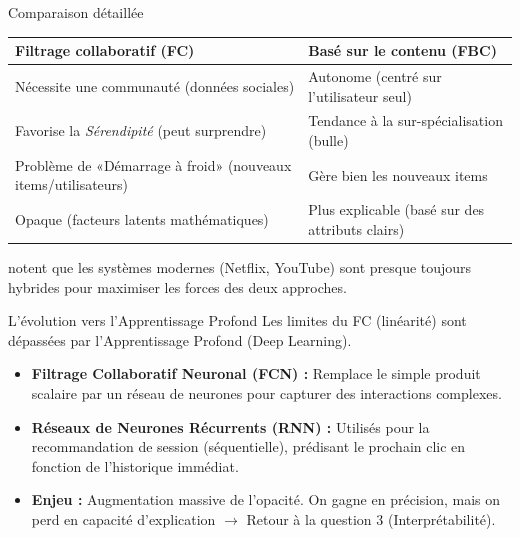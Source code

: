 \documentclass[9pt, aspectratio=169]{beamer}
\begin{document}
\begin{frame}{Comparaison détaillée}
    \begin{table}[]
        \centering
        \small
        \begin{tabular}{@{}p{5cm}p{5cm}@{}}
            \toprule
            \textbf{Filtrage collaboratif (FC)} & \textbf{Basé sur le contenu (FBC)} \\ \midrule
            Nécessite une communauté (données sociales) & Autonome (centré sur l'utilisateur seul) \\
            Favorise la \textit{Sérendipité} (peut surprendre) & Tendance à la sur-spécialisation (bulle) \\
            Problème de «Démarrage à froid» (nouveaux items/utilisateurs) & Gère bien les nouveaux items \\
            Opaque (facteurs latents mathématiques) & Plus explicable (basé sur des attributs clairs) \\ \bottomrule
        \end{tabular}
    \end{table}
    \textcite{Ko2022} notent que les systèmes modernes (Netflix, YouTube) sont presque toujours hybrides pour maximiser les forces des deux approches.
\end{frame}

\begin{frame}{L'évolution vers l'Apprentissage Profond}
    Les limites du FC (linéarité) sont dépassées par l'Apprentissage Profond (Deep Learning).
    \begin{itemize}
        \item \textbf{Filtrage Collaboratif Neuronal (FCN) :} Remplace le simple produit scalaire par un réseau de neurones pour capturer des interactions complexes.
        \item \textbf{Réseaux de Neurones Récurrents (RNN) :} Utilisés pour la recommandation de session (séquentielle), prédisant le prochain clic en fonction de l'historique immédiat.
        \item \textbf{Enjeu :} Augmentation massive de l'opacité. On gagne en précision, mais on perd en capacité d'explication \(\rightarrow\) Retour à la question 3 (Interprétabilité).
    \end{itemize}
\end{frame}
\end{document}
